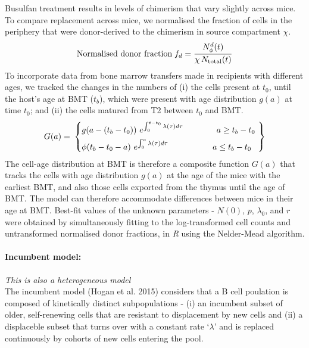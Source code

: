 \documentclass[11.5pt]{article}
\newcommand{\be}{\begin{equation}}
\newcommand{\ee}{\end{equation}}
\begin{document}
Busulfan treatment results in  levels of chimerism that vary slightly across mice. To compare replacement across mice, we normalised the  fraction of cells in the periphery that were donor-derived to the chimerism in source compartment $\chi$.
\be
\text{Normalised donor fraction} \; f_{d} = \frac{N^d_{\phi}(t)} {\chi \, N_\text{total}(t)} \\
\ee 
To incorporate data from bone marrow transfers made in recipients with different ages, we tracked the changes in the numbers of (i) the cells present at $t_0$, until the host's age at BMT ($t_b$), which were present with age distribution $g(a)$ at time $t_{0}$; and (ii) the cells matured from T2 between $t_0$ and BMT. 
\be
\begin{aligned} 
	G(a) =\,\, & \left\{ 
	\begin{aligned} 
		&g(a-(t_b-t_0)) \,\, e^{\int_{0}^{t-t_0} \lambda(\tau) d\tau} \quad \quad \qquad a \geq t_b-t_0\ \\ 
		&\phi(t_b-t_0-a) \,\, e^{\int_{0}^{a} \lambda(\tau) d\tau} \quad \,\, \quad \quad \qquad a \le t_b-t_0\ 
	\end{aligned} 
	\right\} \\ 
\end{aligned} 
\\
\ee
The cell-age distribution at BMT  is therefore a composite function $G(a)$ that tracks the cells with age distribution $g(a)$ at the age of the mice with the earliest BMT, and also those cells exported from the thymus until the age of BMT. The model can therefore accommodate differences between mice in their age at BMT. Best-fit values of the unknown parameters - $N(0)$, $p$, $\lambda_0$, and $r$ were obtained by simultaneously fitting to the log-transformed cell counts and untransformed normalised donor fractions, in {\it R} using  the Nelder-Mead algorithm.


\paragraph{Incumbent model:}
\textit{This is also a heterogeneous model} \\
 The incumbent model (Hogan et al. 2015) considers that a B cell poulation is composed of kinetically distinct subpopulations - (i) an incumbent subset of older, self-renewing cells that are resistant to displacement by new cells and (ii) a displaceble subset that turns over with a constant rate `$\lambda$' and is replaced continuously by cohorts of new cells entering the pool.
 
\end{document}
